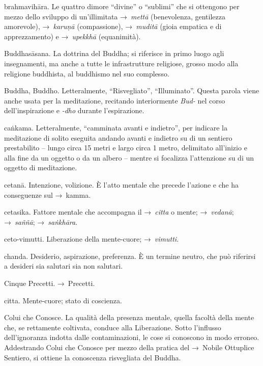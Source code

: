 \begin{glossarydescription}
\item[brahmavihāra.] Le quattro dimore ``divine'' o ``sublimi'' che si
  ottengono per mezzo dello sviluppo di un'illimitata →~\emph{mettā}
  (benevolenza, gentilezza amorevole), →~\emph{karuṇā} (compassione),
  →~\emph{muditā} (gioia empatica e di apprezzamento) e →~\emph{upekkhā}
  (equanimità).

\item[Buddhasāsana.] La dottrina del Buddha; si riferisce in primo luogo
  agli insegnamenti, ma anche a tutte le infrastrutture religiose, grosso modo
  alla religione buddhista, al buddhismo nel suo complesso.

\item[Buddha, Buddho.] Letteralmente, ``Risvegliato'', ``Illuminato''.
  Questa parola viene anche usata per la meditazione, recitando interiormente
  \emph{Bud-} nel corso dell'inspirazione e \emph{-dho} durante l'espirazione.


\item[caṅkama.] Letteralmente, ``camminata avanti e indietro'', per
  indicare la meditazione di solito eseguita andando avanti e indietro su di un
  sentiero prestabilito -- lungo circa 15 metri e largo circa 1 metro,
  delimitato all'inizio e alla fine da un oggetto o da un albero -- mentre si
  focalizza l'attenzione su di un oggetto di meditazione.

\item[cetanā.] Intenzione, volizione. È l'atto mentale che precede
  l'azione e che ha conseguenze sul →~kamma.

\item[cetasika.] Fattore mentale che accompagna il →~\emph{citta} o mente;
  →~\emph{vedanā}; →~\emph{saññā}; →~\emph{saṅkhāra}.

\item[ceto-vimutti.] Liberazione della mente-cuore; →~\emph{vimutti}.

\item[chanda.] Desiderio, aspirazione, preferenza. È un termine neutro,
  che può riferirsi a desideri sia salutari sia non salutari.

\item[Cinque Precetti.] →~Precetti.

\item[citta.] Mente-cuore; stato di coscienza.

\item[Colui che Conosce.] La qualità della presenza mentale, quella facoltà della
  mente che, se rettamente coltivata, conduce alla Liberazione. Sotto l'influsso
  dell'ignoranza indotta dalle contaminazioni, le cose si conoscono in modo
  erroneo. Addestrando Colui che Conosce per mezzo della pratica del →~Nobile
  Ottuplice Sentiero, si ottiene la conoscenza risvegliata del Buddha.


\end{glossarydescription}

